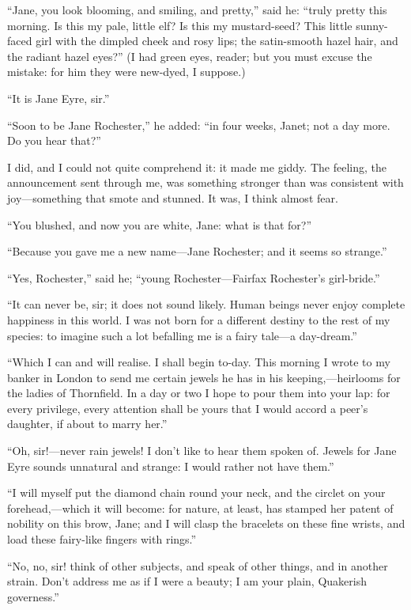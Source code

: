 \enquote{Jane, you look blooming, and smiling, and pretty,} said he:
\enquote{truly pretty this morning.  Is this my pale, little elf?  Is
	this my mustard-seed?  This little sunny-faced girl with the dimpled
	cheek and rosy lips; the satin-smooth hazel hair, and the radiant hazel
	eyes?}  (I had green eyes, reader; but you must excuse the mistake: for
him they were new-dyed, I suppose.)

\enquote{It is Jane Eyre, sir.}

\enquote{Soon to be Jane Rochester,} he added: \enquote{in four weeks,
	Janet; not a day more.  Do you hear that?}

I did, and I could not quite comprehend it: it made me giddy.  The
feeling, the announcement sent through me, was something stronger than
was consistent with joy---something that smote and stunned.  It was, I
think almost fear.

\enquote{You blushed, and now you are white, Jane: what is that for?}

\enquote{Because you gave me a new name---Jane Rochester; and it seems
	so strange.}

\enquote{Yes, \Mrs{} Rochester,} said he; \enquote{young \Mrs{}
	Rochester---Fairfax Rochester's girl-bride.}

\enquote{It can never be, sir; it does not sound likely.  Human beings
	never enjoy complete happiness in this world.  I was not born for a
	different destiny to the rest of my species: to imagine such a lot
	befalling me is a fairy tale---a day-dream.}

\enquote{Which I can and will realise.  I shall begin to-day.  This
	morning I wrote to my banker in London to send me certain jewels he has
	in his keeping,---heirlooms for the ladies of Thornfield.  In a day or
	two I hope to pour them into your lap: for every privilege, every
	attention shall be yours that I would accord a peer's daughter, if about
	to marry her.}

\enquote{Oh, sir!---never rain jewels!  I don't like to hear them spoken
	of.  Jewels for Jane Eyre sounds unnatural and strange: I would rather
	not have them.}

\enquote{I will myself put the diamond chain round your neck, and the
	circlet on your forehead,---which it will become: for nature, at least,
	has stamped her patent of nobility on this brow, Jane; and I will clasp
	the bracelets on these fine wrists, and load these fairy-like fingers
	with rings.}

\enquote{No, no, sir! think of other subjects, and speak of other
	things, and in another strain.  Don't address me as if I were a beauty;
	I am your plain, Quakerish governess.}

